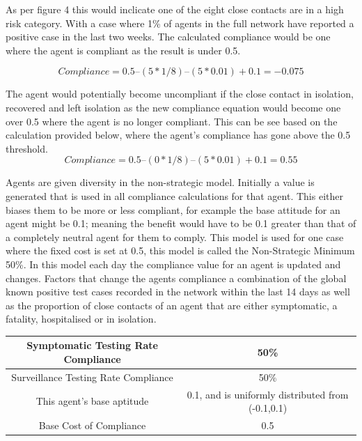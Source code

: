 \documentclass{article}
\begin{document}
As per figure 4 this would inclicate one of the eight close contacts are in a high risk category. With a case where 1\% of agents in the full network have reported a positive case in the last two weeks. The calculated compliance would be one where the agent is compliant as the result is under 0.5.

\[Compliance = 0.5 – (5 * 1/8) – (5*0.01) + 0.1 = -0.075\]


The agent would potentially become uncompliant if the close contact in isolation, recovered and left isolation as the new compliance equation would become one over 0.5 where the agent is no longer compliant. This can be see based on the calculation provided below, where the agent's compliance has gone above the 0.5 threshold.
\[Compliance = 0.5 – (0 * 1/8) – (5*0.01) + 0.1 = 0.55\]



Agents are given diversity in the non-strategic model. Initially a value is generated that is used in all compliance calculations for that agent. This either biases them to be more or less compliant, for example the base attitude for an agent might be 0.1; meaning the benefit would have to be 0.1 greater than that of a completely neutral agent for them to comply. This model is used for one case where the fixed cost is set at 0.5, this model is called the Non-Strategic Minimum 50\%.  In this model each day the compliance value for an agent is updated and changes. Factors that change the agents compliance a combination of the global known positive test cases recorded in the network within the last 14 days as well as the proportion of close contacts of an agent that are either symptomatic, a fatality, hospitalised or in isolation.\newline



\begin{tabular}{|c|c|}
\hline
Symptomatic Testing Rate Compliance & 50\% \\ \hline
Surveillance Testing Rate Compliance & 50\% \\ \hline
This agent’s base aptitude & 0.1, and is uniformly distributed from (-0.1,0.1) \\ \hline
Base Cost of Compliance & 0.5 \\ \hline
\end{tabular}
\newline


\newpage
\end{document}
